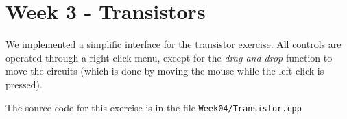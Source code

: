 \chapter{Week 3 - Transistors}

We implemented a simplific interface for the transistor exercise. All controls are operated through a right click menu, except for the \textit{drag and drop} function to move the circuits (which is done by moving the mouse while the left click is pressed).

The source code for this exercise is in the file \texttt{Week04/Transistor.cpp}



